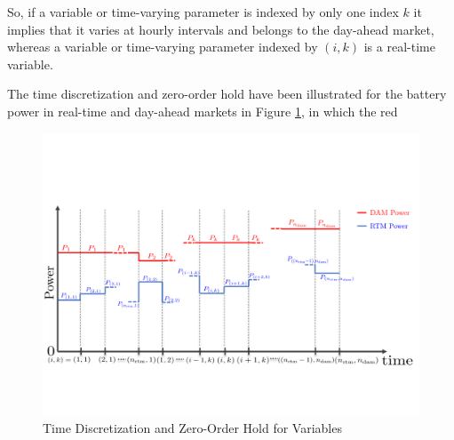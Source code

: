 \documentclass[11pt,twoside]{article}
\begin{document}
So, if a variable or time-varying parameter is indexed by only one index $k$ it implies that it varies at hourly intervals and belongs to the day-ahead market, whereas a variable or time-varying parameter indexed by $(i,k)$ is a real-time variable. 

The time discretization and zero-order hold have been illustrated for the battery power in real-time and day-ahead markets in Figure \ref{fig:discretization}, in which the red 
\begin{figure}[h!]
\begin{center}
\includegraphics[scale=0.7]{Figures/discretization1.pdf} \caption{Time Discretization and Zero-Order Hold for Variables}\label{fig:discretization}\end{center}
\end{figure}
\FloatBarrier
\end{document}

